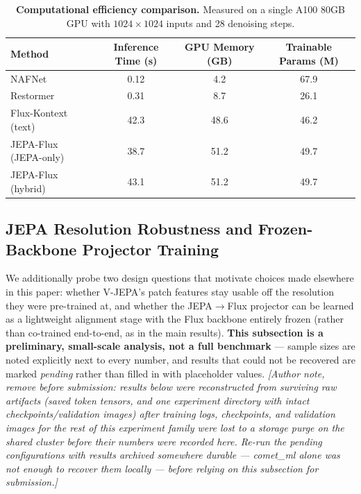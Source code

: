 \documentclass{article}
\begin{document}
\begin{table}[t]
\centering
\caption{\textbf{Computational efficiency comparison.} Measured on a single A100 80GB GPU with $1024 \times 1024$ inputs and 28 denoising steps.}
\label{tab:efficiency}
\vspace{0.5em}
\begin{tabular}{@{}lccc@{}}
\toprule
Method & Inference Time (s) & GPU Memory (GB) & Trainable Params (M) \\
\midrule
NAFNet & 0.12 & 4.2 & 67.9 \\
Restormer & 0.31 & 8.7 & 26.1 \\
Flux-Kontext (text) & 42.3 & 48.6 & 46.2 \\
JEPA-Flux (JEPA-only) & 38.7 & 51.2 & 49.7 \\
JEPA-Flux (hybrid) & 43.1 & 51.2 & 49.7 \\
\bottomrule
\end{tabular}
\end{table}

\subsection{JEPA Resolution Robustness and Frozen-Backbone Projector Training}
\label{sec:resolution_projector}

We additionally probe two design questions that motivate choices made elsewhere in this paper: whether V-JEPA's patch features stay usable off the resolution they were pre-trained at, and whether the JEPA$\to$Flux projector can be learned as a lightweight alignment stage with the Flux backbone entirely frozen (rather than co-trained end-to-end, as in the main results). \textbf{This subsection is a preliminary, small-scale analysis, not a full benchmark} --- sample sizes are noted explicitly next to every number, and results that could not be recovered are marked \textit{pending} rather than filled in with placeholder values. \textit{[Author note, remove before submission: results below were reconstructed from surviving raw artifacts (saved token tensors, and one experiment directory with intact checkpoints/validation images) after training logs, checkpoints, and validation images for the rest of this experiment family were lost to a storage purge on the shared cluster before their numbers were recorded here. Re-run the pending configurations with results archived somewhere durable --- comet\_ml alone was not enough to recover them locally --- before relying on this subsection for submission.]}
\end{document}
